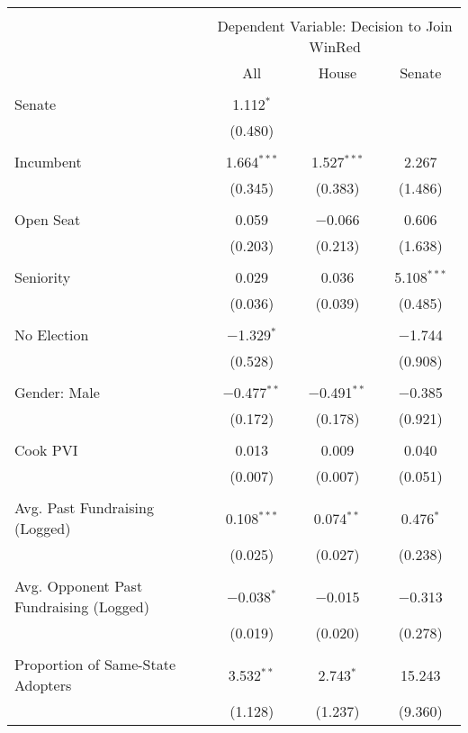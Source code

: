 
\begin{tabular}{@{\extracolsep{5pt}}lccc} 
\\[-1.8ex]\hline 
\hline \\[-1.8ex] 
 & \multicolumn{3}{c}{Dependent Variable: Decision to Join WinRed} \\ 
\cline{2-4} 
 & All & House & Senate \\ 
\hline \\[-1.8ex] 
 Senate & 1.112$^{*}$ &  &  \\ 
  & (0.480) &  &  \\ 
  & & & \\ 
 Incumbent & 1.664$^{***}$ & 1.527$^{***}$ & 2.267 \\ 
  & (0.345) & (0.383) & (1.486) \\ 
  & & & \\ 
 Open Seat & 0.059 & $-$0.066 & 0.606 \\ 
  & (0.203) & (0.213) & (1.638) \\ 
  & & & \\ 
 Seniority & 0.029 & 0.036 & 5.108$^{***}$ \\ 
  & (0.036) & (0.039) & (0.485) \\ 
  & & & \\ 
 No Election & $-$1.329$^{*}$ &  & $-$1.744 \\ 
  & (0.528) &  & (0.908) \\ 
  & & & \\ 
 Gender: Male & $-$0.477$^{**}$ & $-$0.491$^{**}$ & $-$0.385 \\ 
  & (0.172) & (0.178) & (0.921) \\ 
  & & & \\ 
 Cook PVI & 0.013 & 0.009 & 0.040 \\ 
  & (0.007) & (0.007) & (0.051) \\ 
  & & & \\ 
 Avg. Past Fundraising (Logged) & 0.108$^{***}$ & 0.074$^{**}$ & 0.476$^{*}$ \\ 
  & (0.025) & (0.027) & (0.238) \\ 
  & & & \\ 
 Avg. Opponent Past Fundraising (Logged) & $-$0.038$^{*}$ & $-$0.015 & $-$0.313 \\ 
  & (0.019) & (0.020) & (0.278) \\ 
  & & & \\ 
 Proportion of Same-State Adopters & 3.532$^{**}$ & 2.743$^{*}$ & 15.243 \\ 
  & (1.128) & (1.237) & (9.360) \\ 

\end{tabular}
